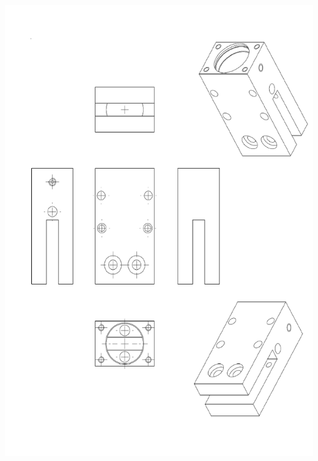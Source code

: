 \documentclass[11pt,oneside]{article}
\begin{document}
\begin{center}
\includegraphics[height=\textheight]{png/fig11}
\end{center}
\end{document}
